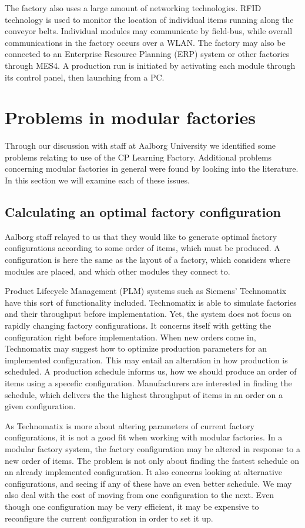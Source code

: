 The factory also uses a large amount of networking technologies. RFID technology is used to monitor the location of individual items running along the conveyor belts. Individual modules may communicate by field-bus, while overall communications in the factory occurs over a WLAN. The factory may also be connected to an Enterprise Resource Planning (ERP) system or other factories through MES4. A production run is initiated by activating each module through its control panel, then launching from a PC.

\section{Problems in modular factories}
Through our discussion with staff at Aalborg University we identified some problems relating to use of the CP Learning Factory. Additional problems concerning modular factories in general were found by looking into the literature. In this section we will examine each of these issues. 

\subsection{Calculating an optimal factory configuration}
Aalborg staff relayed to us that they would like to generate optimal factory configurations according to some order of items, which must be produced. A configuration is here the same as the layout of a factory, which considers where modules are placed, and which other modules they connect to.

Product Lifecycle Management (PLM) systems such as Siemens' Technomatix \cite{Siemens2014} have this sort of functionality included. Technomatix is able to simulate factories and their throughput before implementation. Yet, the system does not focus on rapidly changing factory configurations. It concerns itself with getting the configuration right before implementation. When new orders come in, Technomatix may suggest how to optimize production parameters for an implemented configuration. This may entail an alteration in how production is scheduled. A production schedule informs us, how we should produce an order of items using a specefic configuration. Manufacturers are interested in finding the schedule, which delivers the the highest throughput of items in an order on a given configuration. 

As Technomatix is more about altering parameters of current factory configurations, it is not a good fit when working with modular factories. In a modular factory system, the factory configuration may be altered in response to a new order of items. The problem is not only about finding the fastest schedule on an already implemented configuration. It also concerns looking at alternative configurations, and seeing if any of these have an even better schedule. We may also deal with the cost of moving from one configuration to the next. Even though one configuration may be very efficient, it may be expensive to reconfigure the current configuration in order to set it up. 

